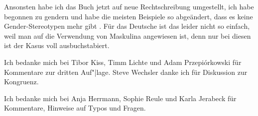 Ansonsten habe ich das Buch jetzt auf neue Rechtschreibung umgestellt, ich habe begonnen zu gendern
und habe die meisten Beispiele so abgeändert, dass es keine Gender-Stereotypen mehr gibt
\citep{MB97a,PCKSDMC2017a}. Für das Deutsche ist das leider nicht so einfach, weil man auf die
Verwendung von Maskulina angewiesen ist, denn nur bei diesen ist der Kasus voll ausbuchstabiert. 

Ich bedanke mich bei Tibor Kiss, Timm Lichte und Adam
Przepiórkowski für Kommentare zur dritten Auf"|lage. Steve Wechsler
danke ich für Diskussion zur Kongruenz.

Ich bedanke mich bei Anja Herrmann, Sophie Reule und Karla Jerabeck für Kommentare, Hinweise auf Typos und Fragen.


%






%

% 


